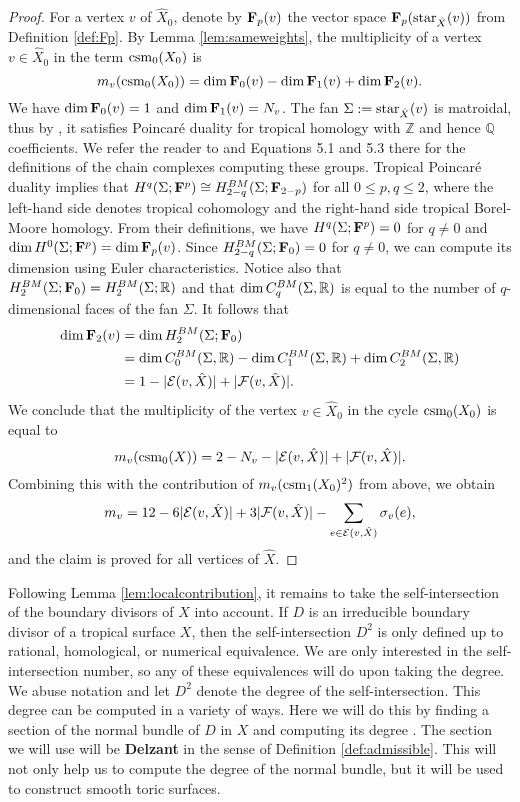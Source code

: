 \begin{proof}
For a vertex $v$ of $\hat{X}_0$, denote by ${\mathbf F}_p(v)$ the vector space ${\mathbf F}_p( \operatorname{star}_{\hat X}(v))$ from Definition \ref{def:Fp}.  
By Lemma \ref{lem:sameweights}, the multiplicity of a vertex $v \in \hat X_0$ in the term $\operatorname{csm}_0(X_0)$ is 
$$m_v(\operatorname{csm}_0(X_0)) = \dim {\mathbf F}_0(v) - \dim {\mathbf F}_1(v) + \dim {\mathbf F}_2(v).$$
We have $\dim {\mathbf F}_0(v) = 1$ and $\dim {\mathbf F}_1(v) = N_v$.
The fan $\Sigma := \operatorname{star}_{\hat X}(v)$ is matroidal, thus by \cite[Theorem 5.3]{JRS},  it satisfies Poincar\'e duality for tropical homology with $\mathbb{Z}$ and hence $\mathbb{Q}$ coefficients. We refer the reader to \cite[Section 5]{JRS} and Equations 5.1 and 5.3 there for the definitions of the chain complexes computing these groups.  Tropical Poincar\'e duality implies that  
 $H^q(\Sigma; {\mathbf F}^p) \cong H^{BM}_{2 - q}(\Sigma; {\mathbf F}_{2 - p})$
for all $0 \leq p, q \leq 2$, where the left-hand side denotes tropical cohomology and the right-hand side tropical Borel-Moore homology.  
From their definitions, we have $H^q(\Sigma; {\mathbf F}^p) = 0$ for $q \neq 0$ and $\dim H^0(\Sigma; {\mathbf F}^p) = \dim {\mathbf F}_p(v)$. 
Since  $H^{BM}_{2 - q}(\Sigma; {\mathbf F}_{0}) = 0 $ for $q \neq 0$, we can compute its dimension using Euler characteristics.  Notice also that $H^{BM}_{2 }(\Sigma; {\mathbf F}_{0}) =H^{BM}_{2 }(\Sigma; \mathbb{R})$ and that $\dim C^{BM}_q(\Sigma, \mathbb{R})$ is equal to the number of $q$-dimensional faces of the fan $\Sigma$. 
It follows that 
\begin{align*}
\dim {\mathbf F}_2(v) &= \dim H^{BM}_2(\Sigma; {\mathbf F}_0) \\
 & = \dim C^{BM}_0(\Sigma, \mathbb{R})  - \dim C^{BM}_1(\Sigma, \mathbb{R}) + \dim C^{BM}_2(\Sigma, \mathbb{R}) \\
  & = 1 - |{\mathcal E}(v, \hat{X})| +  |{\mathcal F}(v, \hat{X})|.
\end{align*}
We conclude that the multiplicity of the vertex $v \in \hat X_0$ in the cycle $\operatorname{csm}_0(X_0)$ is equal to  
$$m_v(\operatorname{csm}_0(X))  = 2 - N_v - |{{\mathcal E}}(v,\hat{X})| + |{{\mathcal F}}(v,\hat{X})|.$$ 
Combining this with the contribution of $m_v(\operatorname{csm}_1(X_0)^2)$ from above, we obtain
$$m_v = 12 - 6|{{\mathcal E}}(v, \hat{X})| + 3|{{\mathcal F}}(v, \hat{X})| - 
\sum_{e \in {{\mathcal E}}(v, \hat{X})} \sigma_v(e),$$
and the claim is proved for all vertices of $\hat{X}$. 
\end{proof}


Following  Lemma \ref{lem:localcontribution}, it remains to take the self-intersection of the boundary divisors of $X$ into account. 
If $D$ is an irreducible  boundary divisor of a  tropical surface $X$, then the self-intersection $D^2$ is only defined up to  rational, homological, or numerical equivalence. 
We are only interested in the self-intersection number, so any of these equivalences will do upon taking the degree. We abuse notation and let  $D^2$ denote the degree of the self-intersection. This degree can be computed in a variety of ways. Here we will do this by finding a section of the normal bundle of $D$ in $X$ and computing its degree \cite{Shaw:Surf}. The section we will use will be {\bf Delzant} in the sense of Definition \ref{def:admissible}. This will not only help us to compute the degree of the normal bundle, but it will be used to construct smooth toric surfaces. 

